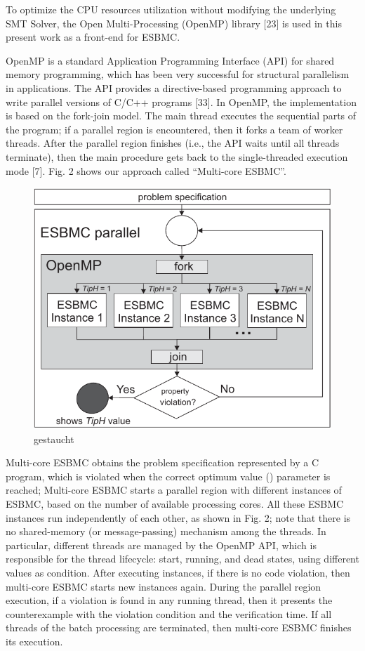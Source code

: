 To optimize the CPU resources utilization without modifying the underlying SMT Solver, the Open Multi-Processing (OpenMP) library [23] is used in this present work as a front-end for ESBMC.

OpenMP is a standard Application Programming Interface (API) for shared memory programming, which has been very successful for structural parallelism in applications. The API provides a directive-based programming approach to write parallel versions of C/C++ programs [33]. In OpenMP, the implementation is based on the fork-join model. The main thread executes the sequential parts of the program; if a parallel region is encountered, then it forks a team of worker threads. After the parallel region finishes (i.e., the API waits until all threads terminate), then the main procedure gets back to the single-threaded execution mode [7]. Fig. 2 shows our approach called “Multi-core ESBMC”.
\begin{figure}[ht]
	\centering
  \includegraphics[scale=0.75]{Image/esbmc-parallel.pdf} 
	\caption{gestaucht}
\end{figure}

Multi-core ESBMC obtains the problem specification represented by a C program, which is violated when the correct optimum value () parameter is reached; Multi-core ESBMC starts a parallel region with  different instances of ESBMC, based on the number of available processing cores. All these ESBMC instances run independently of each other, as shown in Fig. 2; note that there is no shared-memory (or message-passing) mechanism among the threads. In particular, different threads are managed by the OpenMP API, which is responsible for the thread lifecycle: start, running, and dead states, using different  values as condition. After executing  instances, if there is no code violation, then multi-core ESBMC starts  new instances again. During the parallel region execution, if a violation is found in any running thread, then it presents the counterexample with the violation condition and the verification time. If all threads of the batch processing are terminated, then multi-core ESBMC finishes its execution.


